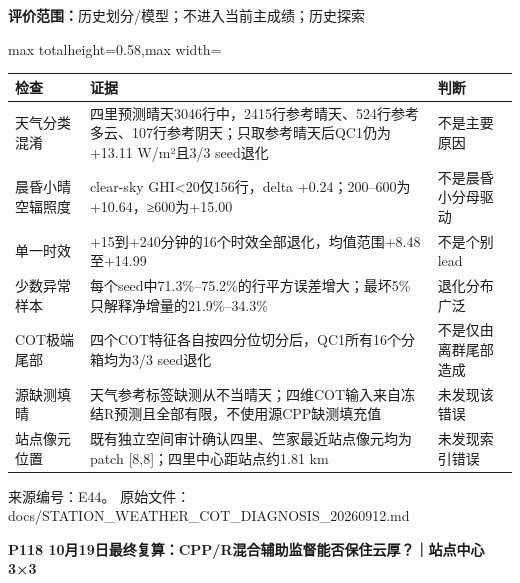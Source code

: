 \documentclass[UTF8,a4paper,landscape,10pt]{ctexart}
\begin{document}
{\small\color{muted}\textbf{评价范围：}历史划分/\allowbreak{}模型；不进入当前主成绩；历史探索}\par\vspace{3mm}
\begin{center}\small
\begin{adjustbox}{max totalheight=0.58\textheight,max width=\linewidth}
\begin{minipage}{\linewidth}\begin{tabularx}{\linewidth}{>{\hsize=0.4500\hsize\raggedright\arraybackslash}X>{\hsize=0.8000\hsize\raggedright\arraybackslash}X>{\hsize=1.7500\hsize\raggedright\arraybackslash}X}\toprule
\textbf{检查} & \textbf{证据} & \textbf{判断} \\ \midrule
天气分类混淆 & 四里预测晴天3046行中，2415行参考晴天、524行参考多云、107行参考阴天；只取参考晴天后QC1仍为+13.11 W/\allowbreak{}m²且3/\allowbreak{}3 seed退化 & 不是主要原因 \\
晨昏小晴空辐照度 & clear-sky GHI<20仅156行，delta +0.24；200–600为+10.64，≥600为+15.00 & 不是晨昏小分母驱动 \\
单一时效 & +15到+240分钟的16个时效全部退化，均值范围+8.48至+14.99 & 不是个别lead \\
少数异常样本 & 每个seed中71.3\%–75.2\%的行平方误差增大；最坏5\%只解释净增量的21.9\%–34.3\% & 退化分布广泛 \\
COT极端尾部 & 四个COT特征各自按四分位切分后，QC1所有16个分箱均为3/\allowbreak{}3 seed退化 & 不是仅由离群尾部造成 \\
源缺测填晴 & 天气参考标签缺测从不当晴天；四维COT输入来自冻结R预测且全部有限，不使用源CPP缺测填充值 & 未发现该错误 \\
站点像元位置 & 既有独立空间审计确认四里、竺家最近站点像元均为patch [8,8]；四里中心距站点约1.81 km & 未发现索引错误 \\
\bottomrule\end{tabularx}\end{minipage}\end{adjustbox}\end{center}
\vfill{\scriptsize\color{muted} 来源编号：E44。 原始文件：docs/\allowbreak{}STATION\_\allowbreak{}WEATHER\_\allowbreak{}COT\_\allowbreak{}DIAGNOSIS\_\allowbreak{}20260912.md}\par
\clearpage
{\large\bfseries\color{ink} P118  10月19日最终复算：CPP/\allowbreak{}R混合辅助监督能否保住云厚？｜站点中心3×3}\par
{}\par
\end{document}

